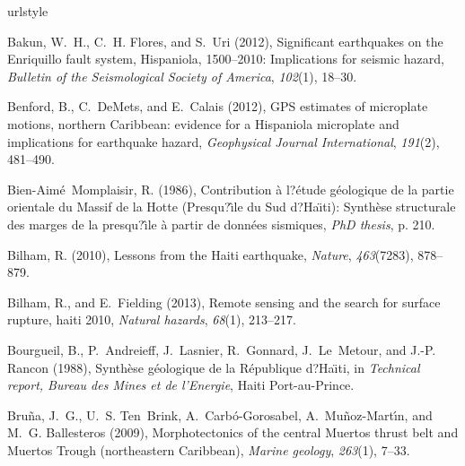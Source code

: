 \documentclass[linenumbers,draft]{agujournal}
\providecommand{\DIFaddend}{} %
\begin{document}
\begin{thebibliography}{62}
\DIFaddend \providecommand{\natexlab}[1]{#1}
\expandafter\ifx\csname urlstyle\endcsname\relax
  \providecommand{\doi}[1]{doi:\discretionary{}{}{}#1}\else
  \providecommand{\doi}{doi:\discretionary{}{}{}\begingroup
  \urlstyle{rm}\Url}\fi

Bakun, W.~H., C.~H. Flores, and S.~Uri (2012), Significant earthquakes on the
  {Enriquillo fault system, Hispaniola, 1500--2010: Implications} for seismic
  hazard, \textit{Bulletin of the Seismological Society of America},
  \textit{102}(1), 18--30.

Benford, B., C.~DeMets, and E.~Calais (2012), {GPS} estimates of microplate
  motions, northern {Caribbean}: {evidence for a Hispaniola microplate and
  implications for earthquake hazard}, \textit{Geophysical Journal
  International}, \textit{191}(2), 481--490.

Bien-Aim{\'e}~Momplaisir, R. (1986), {Contribution {\`a} l?{\'e}tude
  g{\'e}ologique de la partie orientale du Massif de la Hotte (Presqu?{\^\i}le
  du Sud d?Ha{\"\i}ti): Synth{\`e}se structurale des marges de la
  presqu?{\^\i}le {\`a} partir de donn{\'e}es sismiques}, \textit{PhD thesis},
  p. 210.

Bilham, R. (2010), {Lessons from the Haiti earthquake}, \textit{Nature},
  \textit{463}(7283), 878--879.

Bilham, R., and E.~Fielding (2013), Remote sensing and the search for surface
  rupture, haiti 2010, \textit{Natural hazards}, \textit{68}(1), 213--217.

Bourgueil, B., P.~Andreieff, J.~Lasnier, R.~Gonnard, J.~Le~Metour, and J.-P.
  Rancon (1988), {Synth{\`e}se g{\'e}ologique de la R{\'e}publique
  d?Ha{\"\i}ti}, in \textit{Technical report, Bureau des Mines et de
  l'Energie}, Haiti Port-au-Prince.

Bru{\~n}a, J.~G., U.~S. Ten~Brink, A.~Carb{\'o}-Gorosabel,
  A.~Mu{\~n}oz-Mart{\'\i}n, and M.~G. Ballesteros (2009), {Morphotectonics of
  the central Muertos thrust belt and Muertos Trough (northeastern Caribbean)},
  \textit{Marine geology}, \textit{263}(1), 7--33.


\end{thebibliography}
\end{document}
